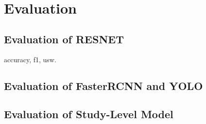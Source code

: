 \chapter{Evaluation}\label{chapter:evaluation}


\section{Evaluation of RESNET}

accuracy, f1, usw.

\section{Evaluation of FasterRCNN and YOLO}


\section{Evaluation of Study-Level Model}
